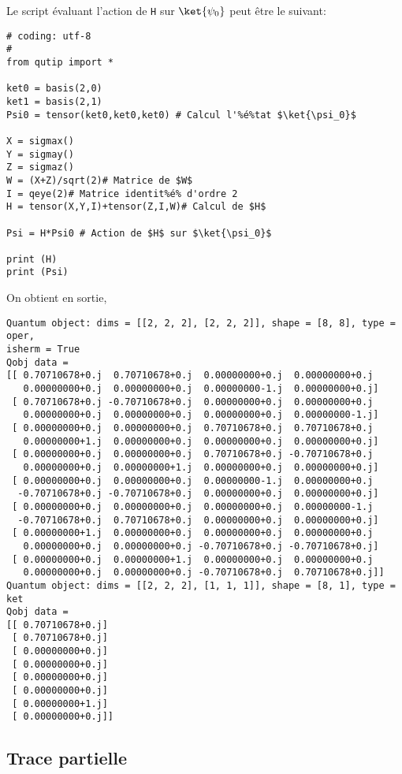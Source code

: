 Le script évaluant l'action de \texttt{H} sur $\ket{\psi_0}$ peut être le 
suivant:\\
\begin{lstlisting}[commentstyle=\scriptsize]
# coding: utf-8 
#
from qutip import *

ket0 = basis(2,0)
ket1 = basis(2,1)
Psi0 = tensor(ket0,ket0,ket0) # Calcul l'%é%tat $\ket{\psi_0}$

X = sigmax()
Y = sigmay()
Z = sigmaz()
W = (X+Z)/sqrt(2)# Matrice de $W$
I = qeye(2)# Matrice identit%é% d'ordre 2
H = tensor(X,Y,I)+tensor(Z,I,W)# Calcul de $H$

Psi = H*Psi0 # Action de $H$ sur $\ket{\psi_0}$

print (H)
print (Psi)
\end{lstlisting}
On obtient en sortie,
\begin{lstlisting}
Quantum object: dims = [[2, 2, 2], [2, 2, 2]], shape = [8, 8], type = oper, 
isherm = True
Qobj data =
[[ 0.70710678+0.j  0.70710678+0.j  0.00000000+0.j  0.00000000+0.j
   0.00000000+0.j  0.00000000+0.j  0.00000000-1.j  0.00000000+0.j]
 [ 0.70710678+0.j -0.70710678+0.j  0.00000000+0.j  0.00000000+0.j
   0.00000000+0.j  0.00000000+0.j  0.00000000+0.j  0.00000000-1.j]
 [ 0.00000000+0.j  0.00000000+0.j  0.70710678+0.j  0.70710678+0.j
   0.00000000+1.j  0.00000000+0.j  0.00000000+0.j  0.00000000+0.j]
 [ 0.00000000+0.j  0.00000000+0.j  0.70710678+0.j -0.70710678+0.j
   0.00000000+0.j  0.00000000+1.j  0.00000000+0.j  0.00000000+0.j]
 [ 0.00000000+0.j  0.00000000+0.j  0.00000000-1.j  0.00000000+0.j
  -0.70710678+0.j -0.70710678+0.j  0.00000000+0.j  0.00000000+0.j]
 [ 0.00000000+0.j  0.00000000+0.j  0.00000000+0.j  0.00000000-1.j
  -0.70710678+0.j  0.70710678+0.j  0.00000000+0.j  0.00000000+0.j]
 [ 0.00000000+1.j  0.00000000+0.j  0.00000000+0.j  0.00000000+0.j
   0.00000000+0.j  0.00000000+0.j -0.70710678+0.j -0.70710678+0.j]
 [ 0.00000000+0.j  0.00000000+1.j  0.00000000+0.j  0.00000000+0.j
   0.00000000+0.j  0.00000000+0.j -0.70710678+0.j  0.70710678+0.j]]
Quantum object: dims = [[2, 2, 2], [1, 1, 1]], shape = [8, 1], type = ket
Qobj data =
[[ 0.70710678+0.j]
 [ 0.70710678+0.j]
 [ 0.00000000+0.j]
 [ 0.00000000+0.j]
 [ 0.00000000+0.j]
 [ 0.00000000+0.j]
 [ 0.00000000+1.j]
 [ 0.00000000+0.j]]
\end{lstlisting}

\subsection{Trace partielle}

